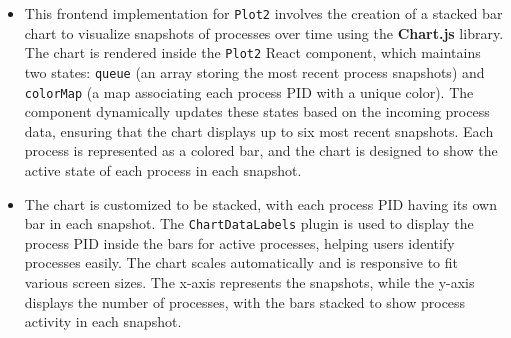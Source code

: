 \documentclass[12pt]{article}
\begin{document}
\begin{itemize}
\begin{itemize}
    \item This frontend implementation for \texttt{Plot2} involves the creation of a stacked bar chart to visualize snapshots of processes over time using the \textbf{Chart.js} library. The chart is rendered inside the \texttt{Plot2} React component, which maintains two states: \texttt{queue} (an array storing the most recent process snapshots) and \texttt{colorMap} (a map associating each process PID with a unique color). The component dynamically updates these states based on the incoming process data, ensuring that the chart displays up to six most recent snapshots. Each process is represented as a colored bar, and the chart is designed to show the active state of each process in each snapshot.\\
    \item The chart is customized to be stacked, with each process PID having its own bar in each snapshot. The \texttt{ChartDataLabels} plugin is used to display the process PID inside the bars for active processes, helping users identify processes easily. The chart scales automatically and is responsive to fit various screen sizes. The x-axis represents the snapshots, while the y-axis displays the number of processes, with the bars stacked to show process activity in each snapshot.
\end{itemize}


\end{itemize}
\end{document}
